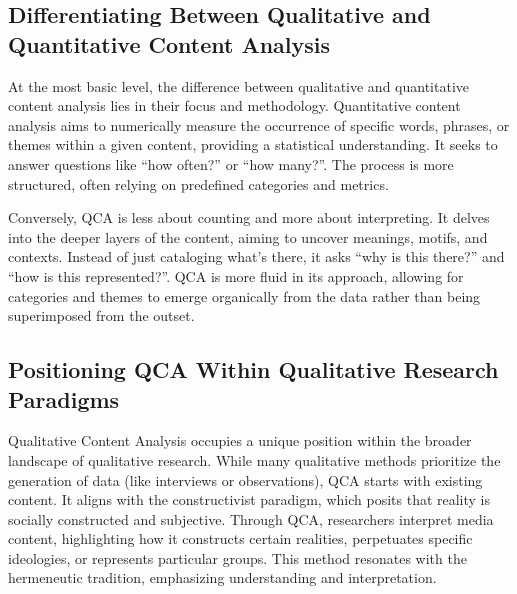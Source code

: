 \documentclass[
  b5paper]{book}
\begin{document}
\hypertarget{differentiating-between-qualitative-and-quantitative-content-analysis}{%
\subsection*{Differentiating Between Qualitative and Quantitative Content Analysis}\label{differentiating-between-qualitative-and-quantitative-content-analysis}}

At the most basic level, the difference between qualitative and quantitative content analysis lies in their focus and methodology. Quantitative content analysis aims to numerically measure the occurrence of specific words, phrases, or themes within a given content, providing a statistical understanding. It seeks to answer questions like ``how often?'' or ``how many?''. The process is more structured, often relying on predefined categories and metrics.

Conversely, QCA is less about counting and more about interpreting. It delves into the deeper layers of the content, aiming to uncover meanings, motifs, and contexts. Instead of just cataloging what's there, it asks ``why is this there?'' and ``how is this represented?''. QCA is more fluid in its approach, allowing for categories and themes to emerge organically from the data rather than being superimposed from the outset.

\hypertarget{positioning-qca-within-qualitative-research-paradigms}{%
\subsection*{Positioning QCA Within Qualitative Research Paradigms}\label{positioning-qca-within-qualitative-research-paradigms}}

Qualitative Content Analysis occupies a unique position within the broader landscape of qualitative research. While many qualitative methods prioritize the generation of data (like interviews or observations), QCA starts with existing content. It aligns with the constructivist paradigm, which posits that reality is socially constructed and subjective. Through QCA, researchers interpret media content, highlighting how it constructs certain realities, perpetuates specific ideologies, or represents particular groups. This method resonates with the hermeneutic tradition, emphasizing understanding and interpretation.
\end{document}

